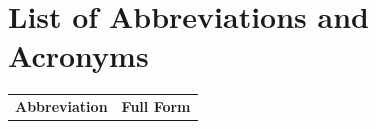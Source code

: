
\chapter*{List of Abbreviations and Acronyms}
\thispagestyle{plain}

\begin{longtable}{@{}p{3.5cm}p{10cm}@{}}
\textbf{Abbreviation} & \textbf{Full Form} \\[0.3cm]


\end{longtable}
